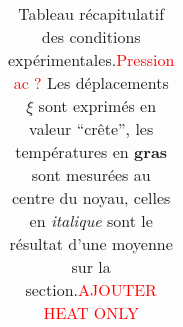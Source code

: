\begin{table}[!ht]
\begin{tabular}{ llll llll llll ll}
	\end{tabular}
	\caption{Tableau récapitulatif des conditions expérimentales.\textcolor{red}{Pression ac  ?} Les déplacements $\xi$ sont exprimés en valeur ``crête'', les températures en \textbf{gras} sont mesurées au centre du noyau, celles en \textit{italique} sont le résultat d'une moyenne sur la section.\textcolor{red}{AJOUTER HEAT ONLY}}
	\label{tab:RecapCondExpe}
\end{table}


